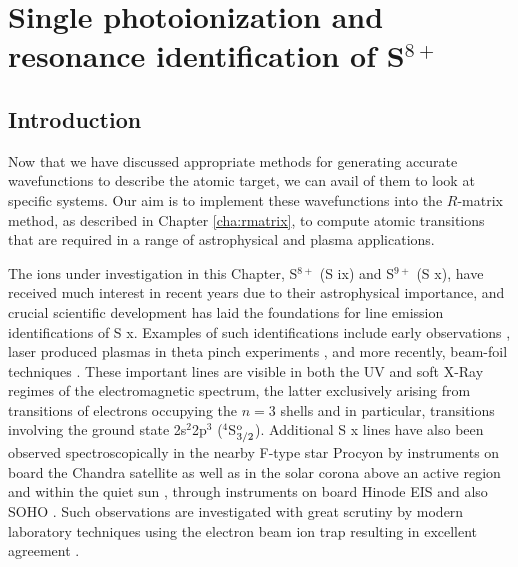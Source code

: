\chapter{Single photoionization and resonance identification of S$^{8+}$}
\label{cha:sulphur} 

                           
\section{Introduction}\label{sec:sul_intro}
Now that we have discussed appropriate methods for generating accurate wavefunctions to describe the atomic target, we can avail of them to look at specific systems. Our aim is to implement these wavefunctions into the $R$-matrix method, as described in Chapter \ref{cha:rmatrix}, to compute atomic transitions that are required in a range of astrophysical and plasma applications.

The ions under investigation in this Chapter, S$^{8+}$ (S {\sc ix}) and S$^{9+}$ (S {\sc x}), have received much interest in recent years due to their astrophysical importance, and crucial scientific development has laid the foundations for line emission identifications of S {\sc x}. Examples of such identifications include early observations \cite{1965AnAp...28..755T}, laser produced plasmas in theta pinch experiments \cite{1973PhyS....8..244F, 1987PhyS...36...80F, 1966ApJ...144..435D, 1967ApJ...149..451D}, and more recently, beam-foil techniques \cite{1999PhyS...59..355K}. These important lines are visible in both the UV and soft X-Ray regimes of the electromagnetic spectrum, the latter exclusively arising from transitions of electrons occupying the $n = 3$ shells and in particular, transitions involving the ground state 2s$^2$2p$^3$ ($^4$S$_{3/2}^{\rm o}$). Additional S {\sc x} lines have also been observed spectroscopically in the nearby F-type star Procyon \cite{0004-637X-762-1-53} by instruments on board the Chandra satellite \cite{2000SpiE.4012...81B} as well as in the solar corona above an active region and within the quiet sun \cite{2003ApJ...582.1162M, 2012A&A...537A..38D}, through instruments on board Hinode EIS \cite{2007SoPh..243...19C} and also SOHO \cite{1995SoPh..162....1D}. Such observations are investigated with great scrutiny by modern laboratory techniques using the electron beam ion trap resulting in excellent agreement \cite{2014ApJ...788...25B, 2014ApJS..215....6T}.

